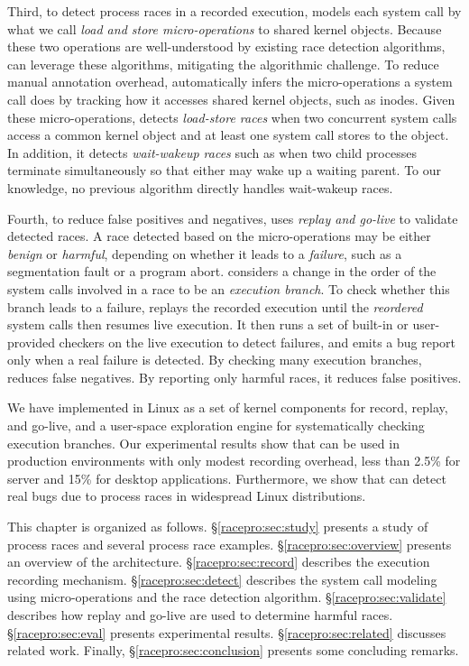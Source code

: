 Third, to detect process races in a recorded execution,
\racepro models each system call by what we call
\emph{load and store micro-operations} to shared kernel objects. 
Because these two operations are well-understood by existing race
detection algorithms, \racepro can leverage these
algorithms, mitigating the algorithmic challenge.  To reduce manual
annotation overhead, \racepro automatically infers
the micro-operations a system call does by tracking how it
accesses shared kernel objects, such as inodes.  
Given these micro-operations, \racepro detects \emph{load-store
races} when two concurrent system calls access a common kernel object
and at least one system call stores to the object.
In addition, it detects \emph{wait-wakeup races} such as
when two child processes terminate simultaneously 
so that either may wake up a waiting parent.
To our knowledge, no previous algorithm directly handles wait-wakeup races.

Fourth, to reduce false positives and negatives, \racepro uses 
\emph{replay and go-live} to validate detected races.
A race detected based on the micro-operations may be either \emph{benign}
or \emph{harmful}, depending on whether it leads to a \emph{failure}, such
as a segmentation fault or a program abort.
\racepro considers a change in the order of the system
calls involved in a race to be an \emph{execution branch}.  To check
whether this branch leads 
to a failure, \racepro replays the recorded execution until the \emph{reordered}
system calls then resumes live execution.  It then runs a set of built-in or
user-provided checkers on the live execution to detect failures,
and emits a bug report only when a real failure is detected.
By checking many execution branches,
\racepro reduces false negatives.  By reporting only harmful races, it
reduces false positives. 

We have implemented \racepro in Linux as a set of kernel components for
record, replay, and go-live, and a user-space exploration engine for
systematically checking execution branches.  Our experimental results
show that \racepro can be used in production environments with only
modest recording overhead, less than 2.5\% for server and 15\% for
desktop applications.  Furthermore, we show that \racepro can detect
\nracepro real bugs due to process races in widespread Linux
distributions. 

This chapter is organized as follows.  \S\ref{racepro:sec:study} presents a
study of process races and several process race examples.
\S\ref{racepro:sec:overview} presents an overview of the \racepro architecture.
\S\ref{racepro:sec:record} describes the execution recording mechanism.
\S\ref{racepro:sec:detect} describes  the system call modeling using
micro-operations and the race detection algorithm.
\S\ref{racepro:sec:validate} describes how replay and go-live are used to
determine harmful races.  \S\ref{racepro:sec:eval} presents experimental
results. \S\ref{racepro:sec:related} discusses related work.  Finally, 
\S\ref{racepro:sec:conclusion} presents some concluding remarks.

